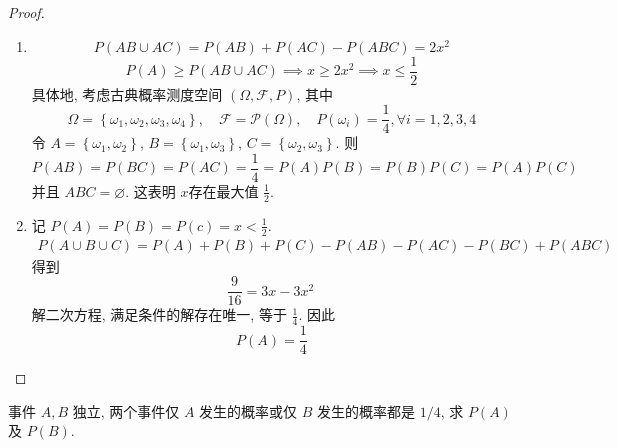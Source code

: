 \documentclass[../main.tex]{subfiles}
\begin{document}
\begin{proof}
  \begin{enumerate}
    \item    \[
    P\left( AB\cup AC \right)= P\left( AB \right)+ P\left( AC \right)-P\left( ABC \right)= 2x^{2}    
    \] \[
    P\left( A \right)\ge P\left( AB\cup AC \right)\implies  x\ge 2x^{2}\implies x\le \frac{1 }{2 }   
    \]
    具体地, 考虑古典概率测度空间 \(  \left(  \Omega , \mathcal{F},P \right)   \), 其中 \[
     \Omega = \left\{  \omega _1 , \omega _2 , \omega _3 , \omega _4  \right\},\quad \mathcal{F}= \mathcal{P}\left(  \Omega  \right),\quad  P\left(  \omega _{i} \right)= \frac{1 }{4 }, \forall i= 1,2,3,4   
    \] 令 \(  A= \left\{  \omega _1 , \omega _2  \right\}  \), \(  B= \left\{  \omega _1 , \omega _3  \right\}  \), \(  C= \left\{  \omega _2 , \omega _3  \right\}  \). 则 \[
    P\left( AB \right)= P\left( BC \right)= P\left( AC \right)=  \frac{1 }{4 }= P\left( A \right)P\left( B \right)= P\left( B \right)P\left( C \right)= P\left( A \right)P\left( C \right)         
    \]并且 \(  ABC= \varnothing  \). 这表明 \(  x  \)存在最大值 \(  \frac{1 }{2 }   \).
    \item       记 \(  P\left( A \right)= P\left( B \right)= P\left( c \right)= x< \frac{1 }{2 }      \). \[
    \begin{aligned}
    P\left( A\cup B\cup C \right)= P\left( A \right)+ P\left( B \right)+ P\left( C \right)-P\left( AB \right)-P\left( AC \right)-P\left( BC \right)+ P\left( ABC \right)         
    \end{aligned}
    \]得到 \[
    \frac{9 }{16 }= 3x-3x^{2} \
    \] 解二次方程, 满足条件的解存在唯一, 等于 \(  \frac{1 }{4 }   \). 因此 \[
    P\left( A \right)= \frac{1 }{4 }  
    \] 
  \end{enumerate}
  
\end{proof}
\begin{exercise}{}{}
事件 $A, B$ 独立, 两个事件仅 $A$ 发生的概率或仅 $B$ 发生的概率都是 $1/4$, 求 $P(A)$ 及 $P(B)$.
\end{exercise}
\end{document}
